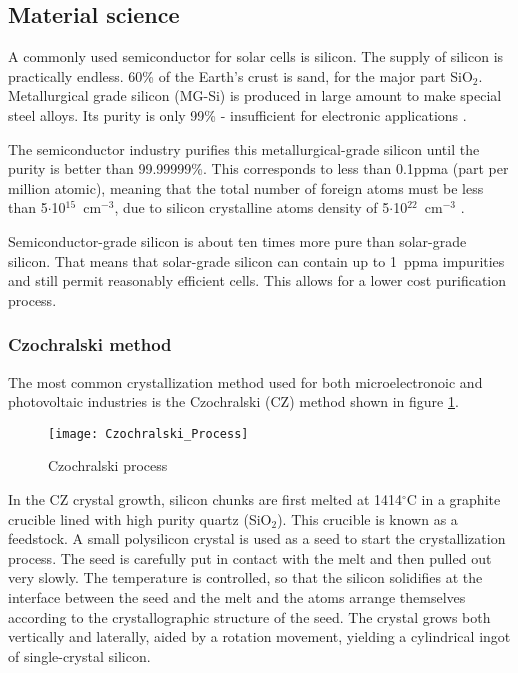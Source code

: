 \subsection{Material science}

A commonly used semiconductor for solar cells is silicon. The supply of silicon is practically endless. 60\% of the Earth's crust is sand, for the major part SiO$_2$. Metallurgical grade silicon (MG-Si) is produced in large amount to make special steel alloys. Its purity is only 99\% - insufficient for electronic applications \cite{solar_cells}. 

The semiconductor industry purifies this metallurgical-grade silicon until the purity is better than 99.99999\%. This corresponds to less than 0.1ppma (part per million atomic), meaning that the total number of foreign atoms must be less than 5$\cdot$10${^15}$~cm$^{-3}$, due to silicon crystalline atoms density of 5$\cdot$10$^{22}$~cm$^{-3}$ \cite{solar_cells}.

Semiconductor-grade silicon is about ten times more pure than solar-grade silicon. That means that solar-grade silicon can contain up to 1~ppma impurities and still permit reasonably efficient cells. This allows for a lower cost purification process.

\subsubsection{Czochralski method}

The most common crystallization method used for both microelectronoic and photovoltaic industries is the Czochralski (CZ) \cite{solar_cells} method shown in figure \ref{fig:czochralski_process}.

\begin{figure}[H]
\texttt{[image: Czochralski\_Process]}%
\caption{Czochralski process}%
\label{fig:czochralski_process}%
\end{figure}

In the CZ crystal growth, silicon chunks are first melted at 1414$^\circ$C in a graphite crucible lined with high purity quartz (SiO$_2$). This crucible is known as a feedstock. A small polysilicon crystal is used as a seed to start the crystallization process. The seed is carefully put in contact with the melt and then pulled out very slowly. The temperature is controlled, so that the silicon solidifies at the interface between the seed and the melt and the atoms arrange themselves according to the crystallographic structure of the seed. The crystal grows both vertically and laterally, aided by a rotation movement, yielding a cylindrical ingot of single-crystal silicon. 

